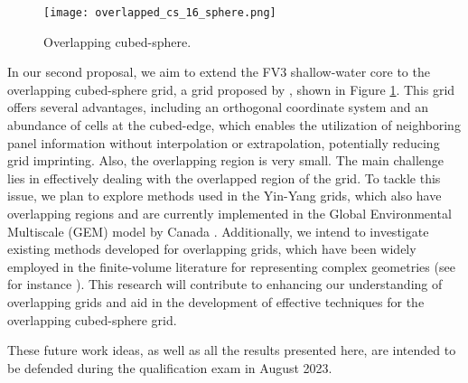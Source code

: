 \begin{figure}[!htb]
	\centering
	\texttt{[image: overlapped\_cs\_16\_sphere.png]}
	\caption{Overlapping cubed-sphere.\label{gridoverlaped}}
\end{figure}

In our second proposal, we aim to extend the FV3 shallow-water core to the overlapping cubed-sphere grid, a grid proposed by \citet{purser:2017}, shown in Figure \ref{gridoverlaped}.
This grid offers several advantages, including an orthogonal coordinate system and an abundance of cells at the cubed-edge,
which enables the utilization of neighboring panel information without interpolation or extrapolation, potentially reducing grid imprinting.
Also, the overlapping region is very small.
The main challenge lies in effectively dealing with the overlapped region of the grid. To tackle this issue, we plan to explore methods used in the Yin-Yang grids, which also have overlapping regions and are currently implemented in the Global Environmental Multiscale (GEM) model by Canada \citep{qaddouri:2011,husain:2019}.
Additionally, we intend to investigate existing methods developed for overlapping grids, which have been widely employed in the finite-volume literature for representing complex geometries
(see for instance \citet{hadzic:2005}).
This research will contribute to enhancing our understanding of overlapping grids and aid in the development of effective techniques for the overlapping cubed-sphere grid.

These future work ideas, as well as all the results presented here, are intended to be defended during the qualification exam in August 2023.